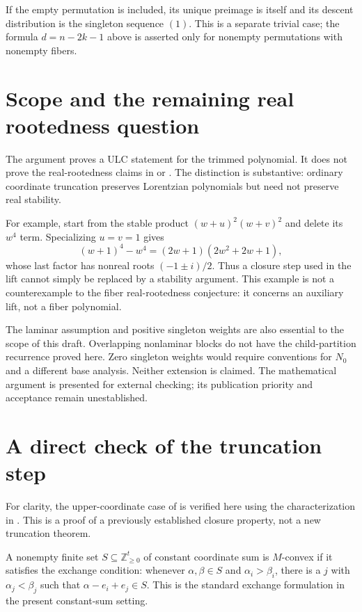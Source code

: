 \documentclass[11pt,letterpaper]{article}
\theoremstyle{definition}
\theoremstyle{remark}
\newcommand{\NN}{\mathbb{Z}_{\geq 0}}
\begin{document}
If the empty permutation is included, its unique preimage is itself and its descent distribution is the singleton sequence $(1)$. This is a separate trivial case; the formula $d=n-2k-1$ above is asserted only for nonempty permutations with nonempty fibers.

\section{Scope and the remaining real rootedness question}
The argument proves a ULC statement for the trimmed polynomial. It does not prove the real-rootedness claims in \cite[Conjecture 31]{Defant2020} or \cite[Conjectures 1.1 and 1.2]{Defant2023}. The distinction is substantive: ordinary coordinate truncation preserves Lorentzian polynomials but need not preserve real stability.

For example, start from the stable product $(w+u)^2(w+v)^2$ and delete its $w^4$ term. Specializing $u=v=1$ gives
\[
 (w+1)^4-w^4=(2w+1)(2w^2+2w+1),
\]
whose last factor has nonreal roots $(-1\pm i)/2$. Thus a closure step used in the lift cannot simply be replaced by a stability argument. This example is not a counterexample to the fiber real-rootedness conjecture: it concerns an auxiliary lift, not a fiber polynomial.

The laminar assumption and positive singleton weights are also essential to the scope of this draft. Overlapping nonlaminar blocks do not have the child-partition recurrence proved here. Zero singleton weights would require conventions for $N_0$ and a different base analysis. Neither extension is claimed. The mathematical argument is presented for external checking; its publication priority and acceptance remain unestablished.

\appendix
\section{A direct check of the truncation step}\label{app:truncation}
For clarity, the upper-coordinate case of \cite[Proposition 3.3]{RSW2025} is verified here using the characterization in \cite[Theorem 2.25]{BH2020}. This is a proof of a previously established closure property, not a new truncation theorem.

A nonempty finite set $S\subseteq\NN^t$ of constant coordinate sum is $M$-convex if it satisfies the exchange condition: whenever $\alpha,\beta\in S$ and $\alpha_i>\beta_i$, there is a $j$ with $\alpha_j<\beta_j$ such that $\alpha-e_i+e_j\in S$. This is the standard exchange formulation in the present constant-sum setting.
\end{document}
